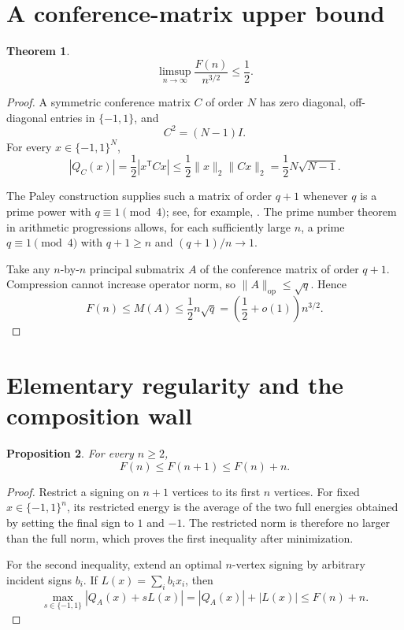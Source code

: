 \documentclass[11pt]{article}
\newtheorem{theorem}{Theorem}
\newtheorem{proposition}[theorem]{Proposition}
\newcommand{\eps}{\{-1,1\}}
\begin{document}
\section{A conference-matrix upper bound}

\begin{theorem}
\label{thm:upper}
\[
 \boxed{\limsup_{n\to\infty}\frac{F(n)}{n^{3/2}}\le\frac12.}
\]
\end{theorem}

\begin{proof}
A symmetric conference matrix \(C\) of order \(N\) has zero diagonal,
off-diagonal entries in \(\eps\), and
\[
 C^2=(N-1)I.
\]
For every \(x\in\eps^N\),
\[
 |Q_C(x)|
 =\frac12|x^{\mathsf T}Cx|
 \le\frac12\|x\|_2\|Cx\|_2
 =\frac12N\sqrt{N-1}.
\]

The Paley construction supplies such a matrix of order \(q+1\) whenever
\(q\) is a prime power with \(q\equiv1\pmod4\); see, for example,
\cite{cameron}. The prime number theorem in arithmetic progressions
allows, for each sufficiently large \(n\), a prime
\(q\equiv1\pmod4\) with \(q+1\ge n\) and \((q+1)/n\to1\).

Take any \(n\)-by-\(n\) principal submatrix \(A\) of the conference
matrix of order \(q+1\). Compression cannot increase operator norm, so
\(\|A\|_{\mathrm{op}}\le\sqrt q\). Hence
\[
 F(n)\le M(A)
 \le\frac12n\sqrt q
 =\left(\frac12+o(1)\right)n^{3/2}.
\]
\end{proof}

\section{Elementary regularity and the composition wall}

\begin{proposition}
\label{prop:monotone}
For every \(n\ge2\),
\[
 F(n)\le F(n+1)\le F(n)+n.
\]
\end{proposition}

\begin{proof}
Restrict a signing on \(n+1\) vertices to its first \(n\) vertices.
For fixed \(x\in\eps^n\), its restricted energy is the average of the
two full energies obtained by setting the final sign to \(1\) and
\(-1\). The restricted norm is therefore no larger than the full norm,
which proves the first inequality after minimization.

For the second inequality, extend an optimal \(n\)-vertex signing by
arbitrary incident signs \(b_i\). If \(L(x)=\sum_i b_ix_i\), then
\[
 \max_{s\in\eps}|Q_A(x)+sL(x)|=|Q_A(x)|+|L(x)|
 \le F(n)+n.
\]
\end{proof}
\end{document}
